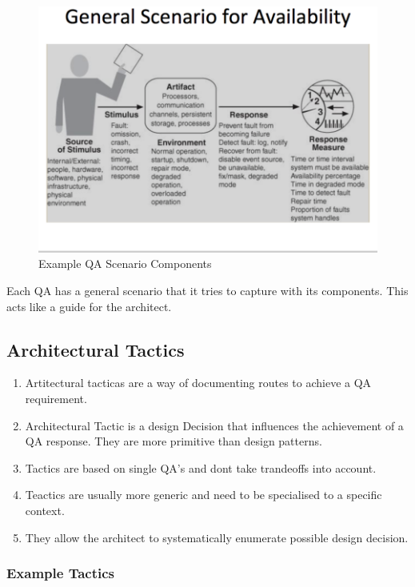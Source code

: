 \documentclass[a4paper]{report}
\begin{document}
\begin{figure}[h]
\centering 
\includegraphics[scale=0.3]{aimages/qascenario.png}
\caption{\label{tab:widgets}Example QA Scenario Components}
\end{figure}


Each QA has a general scenario that it tries to capture with its components. This acts like a guide for the architect.

\subsection{Architectural Tactics} 
\begin{enumerate}
\item Artitectural tacticas are a way of documenting routes to achieve a QA requirement.
\item Architectural Tactic is a design Decision that influences the achievement of a QA response. They are more primitive than design patterns.
\item Tactics are based on single QA's and dont take trandeoffs into account.
\item Teactics are usually more generic and need to be specialised to a specific context.
\item They allow the architect to systematically enumerate possible design decision.
\end{enumerate}

\subsubsection{Example Tactics}
\end{document}
